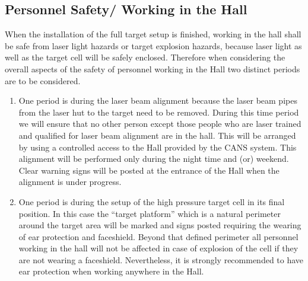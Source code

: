 \begin{safetyen}{10}{5}
\subsection{Personnel Safety/ Working in the Hall}
\label{sec:prs}

When the installation of the full target setup is finished, working in
the hall
shall be safe from laser light hazards or target explosion hazards,
because 
laser light as  well as the target cell will be safely enclosed.
Therefore 
when considering the overall aspects of the safety of personnel working
in the
Hall two distinct periods are to be considered.

\begin{enumerate}

\item One period is during the laser beam alignment because the laser
beam pipes
from the laser hut to the  target need to be removed. During this time
period we
will ensure that no other person except those people who are laser
trained and qualified  for
laser beam alignment are in the hall. This will be arranged by using a
controlled access 
to the Hall provided by the CANS system.
This alignment 
will be performed only during the night time and (or) weekend. 
Clear warning signs will
be posted  at the
entrance of the Hall when the alignment is under progress.

\item One period is during the setup of the high pressure target cell in
its final position. 
In this case the ``target platform'' which is a natural perimeter around
the target area 
 will be marked  and signs posted requiring the wearing of ear
protection and
faceshield. Beyond that defined perimeter all personnel working in the
hall
will not be affected in case of explosion of the cell if they are not 
wearing  a faceshield. Nevertheless, it is strongly recommended to have 
ear protection when working anywhere in the Hall. 
\end{enumerate}
\end{safetyen}

